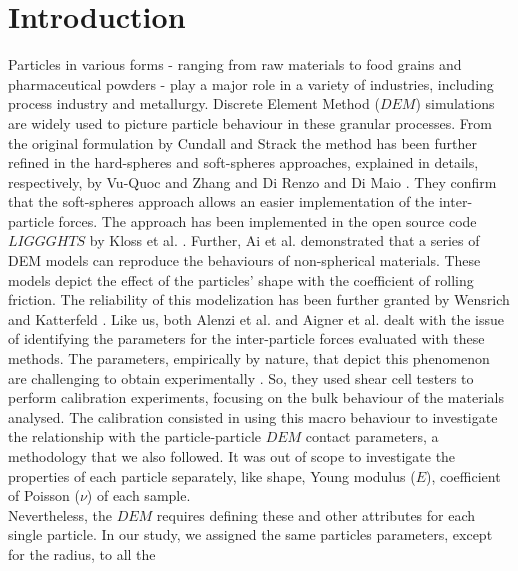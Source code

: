 \section{Introduction}
\label{sec:introduction}

Particles in various forms - ranging from raw materials to food grains and pharmaceutical powders - 
play a major role in a variety of industries, including process industry and
metallurgy.
Discrete Element Method ($DEM$) simulations are widely used to picture particle
behaviour in these granular processes.
From the original formulation by Cundall and Strack \cite{RefWorks:172}
the method has been further refined in the hard-spheres and soft-spheres
approaches, explained in details, respectively, by Vu-Quoc and Zhang
\cite{RefWorks:148} and Di Renzo and Di Maio \cite{RefWorks:145}.
They \cite{RefWorks:145} confirm that the soft-spheres approach
allows an easier implementation of the inter-particle forces.
The approach has been implemented in the open source code $LIGGGHTS$ by
Kloss et al. \cite{RefWorks:136}.
Further, Ai et al. \cite{RefWorks:131} demonstrated that a series of DEM
models can reproduce the behaviours of non-spherical materials.
These models depict the effect of the particles' shape with the coefficient
of rolling friction.
The reliability of this modelization has been further granted by Wensrich and 
Katterfeld \cite{RefWorks:87}.
Like us, both Alenzi et al. \cite{RefWorks:91} and Aigner et al.
\cite{RefWorks:139} dealt with the issue of identifying the parameters for the
inter-particle forces evaluated with these methods.
The parameters, empirically by nature, that depict this phenomenon are challenging
to obtain experimentally \cite{RefWorks:148, RefWorks:145, RefWorks:136,
RefWorks:131, RefWorks:87, RefWorks:91, RefWorks:139, RefWorks:177}.
So, they used shear cell testers to perform calibration experiments, 
focusing on the bulk behaviour of the materials analysed.
The calibration consisted in using this macro behaviour to 
investigate the relationship with the particle-particle $DEM$
contact parameters, a methodology that we also followed.
It was out of scope to investigate the properties of each
particle separately, like shape, Young modulus ($E$), coefficient of Poisson ($\nu$) of each sample.\\
Nevertheless, the $DEM$ requires defining these and other attributes for each
single particle.
In our study, we assigned the same particles parameters, except for the radius, to all the 
